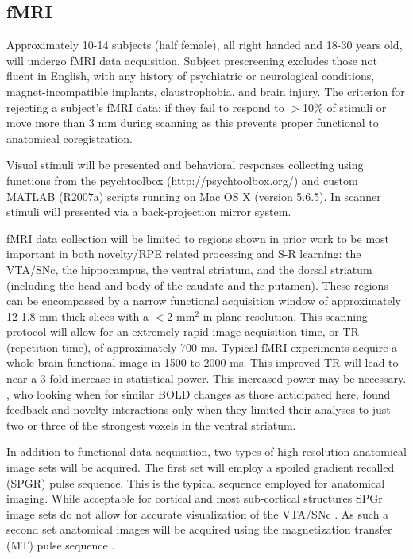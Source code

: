 \documentclass[doc]{apa}        %
\begin{document}
\subsection{fMRI} %
\label{sub:fmri}
Approximately 10-14 subjects (half female), all right handed and 18-30 years old, will undergo fMRI data acquisition.  Subject prescreening excludes those not fluent in English, with any history of psychiatric or neurological conditions, magnet-incompatible implants, claustrophobia, and brain injury.  The criterion for rejecting a subject's fMRI data: if they fail to respond to $>$10\% of stimuli or move more than 3 mm during scanning as this prevents proper functional to anatomical coregistration.

Visual stimuli will be presented and behavioral responses collecting using functions from the psychtoolbox (http://psychtoolbox.org/) and custom MATLAB (R2007a) scripts running on Mac OS X (version 5.6.5).  In scanner stimuli will presented via a back-projection mirror system.

fMRI data collection will be limited to regions shown in prior work to be most important in both novelty/RPE related processing and S-R learning: the VTA/SNc, the hippocampus, the ventral striatum, and the dorsal striatum (including the head and body of the caudate and the putamen).  These regions can be encompassed by a narrow functional acquisition window of approximately 12 1.8 mm thick slices with a $<$2 mm$^2$ in plane resolution.  This scanning protocol will allow for an extremely rapid image acquisition time, or TR (repetition time), of approximately 700 ms.  Typical fMRI experiments acquire a whole brain functional image in 1500 to 2000 ms.  This improved TR will lead to near a 3 fold increase in statistical power.  This increased power may be necessary. , who looking when for similar BOLD changes as those anticipated here, found feedback and novelty interactions only when they limited their analyses to just two or three of the strongest voxels in the ventral striatum.

In addition to functional data acquisition, two types of high-resolution anatomical image sets will be acquired.  The first set will employ a spoiled gradient recalled (SPGR) pulse sequence.  This is the typical sequence employed for anatomical imaging.  While acceptable for cortical and most sub-cortical structures SPGr image sets do not allow for accurate visualization of the VTA/SNc \cite{GuitartMasip:2010p7227}.  As such a second set anatomical images will be acquired using the magnetization transfer (MT) pulse sequence \cite{Helms:2009p7275}.
\end{document}
